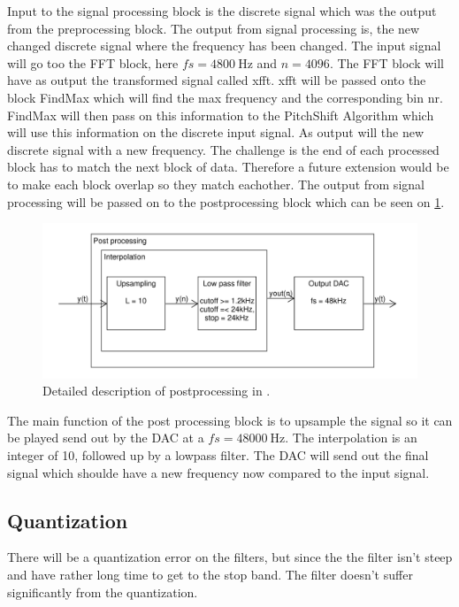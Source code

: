 Input to the signal processing block is the discrete signal which was the output from the preprocessing block. The output from signal processing is, the new changed discrete signal where the frequency has been changed. The input signal will go too the FFT block, here $fs=\SI{4800}{\hertz}$ and $n=4096$. The FFT block will have as output the transformed signal called xfft. xfft will be passed onto the block FindMax which will find the max frequency and the corresponding bin nr. FindMax will then pass on this information to the PitchShift Algorithm which will use this information on the discrete input signal. As output will the new discrete signal with a new frequency. The challenge is the end of each processed block has to match the next block of data. Therefore a future extension would be to make each block overlap so they match eachother. The output from signal processing will be passed on to the postprocessing block which can be seen on \cref{fig:DetailedDesign_postpro}. 

\begin{figure}
	\centering
	\includegraphics[width=1\linewidth]{gfx/Design/DesignDetailed_Postprocessing.pdf}
	\caption{Detailed description of postprocessing in \systemName.}
	\label{fig:DetailedDesign_postpro}
\end{figure}

The main function of the post processing block is to upsample the signal so it can be played send out by the DAC at a $fs=\SI{48000}{\hertz}$. The interpolation is an integer of 10, followed up by a lowpass filter. The DAC will send out the final signal which shoulde have a new frequency now compared to the input signal. 

\subsection{Quantization} 
There will be a quantization error on the filters, but since the the filter isn't steep and have rather long time to get to the stop band. The filter doesn't suffer significantly from the quantization.  

